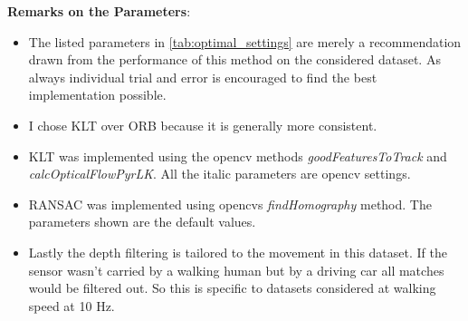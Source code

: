 \textbf{Remarks on the Parameters}:

\begin{itemize}
    \item The listed parameters in \cref{tab:optimal_settings} are merely a recommendation drawn from the performance of this method on the considered dataset. As always individual trial and error is encouraged to find the best implementation possible.
    \item I chose KLT over ORB because it is generally more consistent. 
    \item KLT was implemented using the opencv methods \textit{goodFeaturesToTrack} and \textit{calcOpticalFlowPyrLK}. All the italic parameters are opencv settings. 
    \item RANSAC was implemented using opencvs \textit{findHomography} method. The parameters shown are the default values.
    \item Lastly the depth filtering is tailored to the movement in this dataset. If the sensor wasn't carried by a walking human but by a driving car all matches would be filtered out. So this is specific to datasets considered at walking speed at 10 Hz.
    
\end{itemize}








